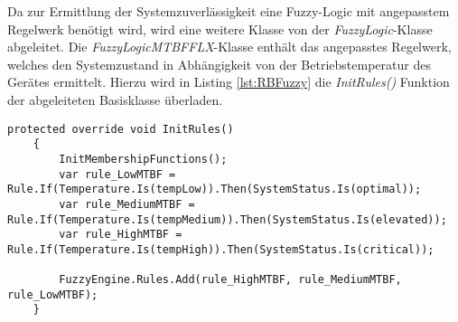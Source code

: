 Da zur Ermittlung der Systemzuverlässigkeit eine Fuzzy-Logic mit angepasstem Regelwerk benötigt wird, wird eine weitere Klasse von der \textit{FuzzyLogic}-Klasse abgeleitet. Die \textit{FuzzyLogicMTBFFLX}-Klasse enthält das angepasstes Regelwerk, welches den Systemzustand in Abhängigkeit von der Betriebstemperatur des Gerätes ermittelt. Hierzu wird in Listing \ref{lst:RBFuzzy} die \textit{InitRules()} Funktion der abgeleiteten Basisklasse überladen. 
\begin{lstlisting}[caption={Implementierung des Regelwerks}, label={lst:RBFuzzy}]
    protected override void InitRules()
    {
        InitMembershipFunctions();
        var rule_LowMTBF = Rule.If(Temperature.Is(tempLow)).Then(SystemStatus.Is(optimal));
        var rule_MediumMTBF = Rule.If(Temperature.Is(tempMedium)).Then(SystemStatus.Is(elevated));
        var rule_HighMTBF = Rule.If(Temperature.Is(tempHigh)).Then(SystemStatus.Is(critical));

        FuzzyEngine.Rules.Add(rule_HighMTBF, rule_MediumMTBF, rule_LowMTBF);
    }\end{lstlisting}

